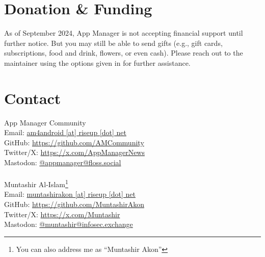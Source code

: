 \section{Donation \& Funding}\label{sec:donation-&-funding} %
%
%
%
%

As of September 2024, App Manager is not accepting financial support until further notice. But
you may still be able to send gifts (e.g., gift cards, subscriptions, food and drink, flowers, or
even cash). Please reach out to the maintainer using the options given in  for further
assistance.


\section{Contact}\label{sec:contact} %
App Manager Community\\
Email: \href{mailto:am4android@riseup.net}{am4android [at] riseup [dot] net}\\
GitHub: \url{https://github.com/AMCommunity}\\
Twitter/X: \url{https://x.com/AppManagerNews}\\
Mastodon: \href{https://floss.social/@appmanager}{@appmanager@floss.social}\\
\\

Muntashir Al-Islam\footnote{You can also address me as ``Muntashir Akon''}\\
Email: \href{mailto:muntashirakon@riseup.net}{muntashirakon [at] riseup [dot] net}\\
GitHub: \url{https://github.com/MuntashirAkon}\\
Twitter/X: \url{https://x.com/Muntashir}\\
Mastodon: \href{https://infosec.exchange/@muntashir}{@muntashir@infosec.exchange}

